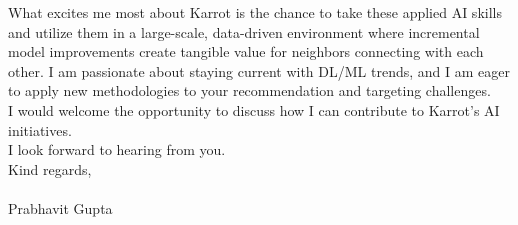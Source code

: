 \documentclass[11pt, a4paper]{article}
\begin{document}
\noindent What excites me most about Karrot is the chance to take these applied AI skills and utilize them in a large-scale, data-driven environment where incremental model improvements create tangible value for neighbors connecting with each other. I am passionate about staying current with DL/ML trends, and I am eager to apply new methodologies to your recommendation and targeting challenges. \\

\noindent I would welcome the opportunity to discuss how I can contribute to Karrot's AI initiatives. \\

\noindent I look forward to hearing from you. \\

\vspace{12pt}
\noindent Kind regards, \\
\vspace{12pt}
\\
\noindent Prabhavit Gupta
\end{document}
